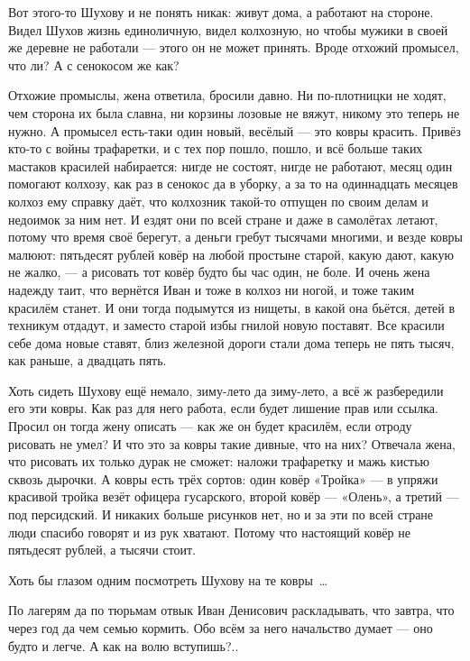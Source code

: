 Вот этого-то Шухову и не понять никак: живут дома, а работают на стороне. Видел Шухов жизнь 
единоличную, видел колхозную, но чтобы мужики в своей же деревне не работали --- этого он не 
может принять. Вроде отхожий промысел, что ли? А с сенокосом же как?

Отхожие промыслы, жена ответила, бросили давно. Ни по-плотницки не ходят, чем сторона их была 
славна, ни корзины лозовые не вяжут, никому это теперь не нужно. А промысел есть-таки один 
новый, весёлый --- это ковры красить. Привёз кто-то с войны трафаретки, и с тех пор пошло, пошло, 
и всё больше таких мастаков красилей набирается: нигде не состоят, нигде не работают, месяц 
один помогают колхозу, как раз в сенокос да в уборку, а за то на одиннадцать месяцев колхоз 
ему справку даёт, что колхозник такой-то отпущен по своим делам и недоимок за ним нет. И ездят 
они по всей стране и даже в самолётах летают, потому что время своё берегут, а деньги гребут 
тысячами многими, и везде ковры малюют: пятьдесят рублей ковёр на любой простыне старой, 
какую дают, какую не жалко, --- а рисовать тот ковёр будто бы час один, не боле. И очень жена 
надежду таит, что вернётся Иван и тоже в колхоз ни ногой, и тоже таким красилём станет. И они 
тогда подымутся из нищеты, в какой она бьётся, детей в техникум отдадут, и заместо старой 
избы гнилой новую поставят. Все красили себе дома новые ставят, близ железной дороги стали 
дома теперь не пять тысяч, как раньше, а двадцать пять.

Хоть сидеть Шухову ещё немало, зиму-лето да зиму-лето, а всё ж разбередили его эти ковры. Как 
раз для него работа, если будет лишение прав или ссылка. Просил он тогда жену описать --- как 
же он будет красилём, если отроду рисовать не умел? И что это за ковры такие дивные, что на 
них? Отвечала жена, что рисовать их только дурак не сможет: наложи трафаретку и мажь кистью 
сквозь дырочки. А ковры есть трёх сортов: один ковёр «Тройка» --- в упряжи красивой тройка 
везёт офицера гусарского, второй ковёр --- «Олень», а третий --- под персидский. И никаких 
больше рисунков нет, но и за эти по всей стране люди спасибо говорят и из рук хватают. Потому 
что настоящий ковёр не пятьдесят рублей, а тысячи стоит.

Хоть бы глазом одним посмотреть Шухову на те ковры~\dots{}

По лагерям да по тюрьмам отвык Иван Денисович раскладывать, что завтра, что через год да чем 
семью кормить. Обо всём за него начальство думает --- оно будто и легче. А как на волю 
вступишь?..


